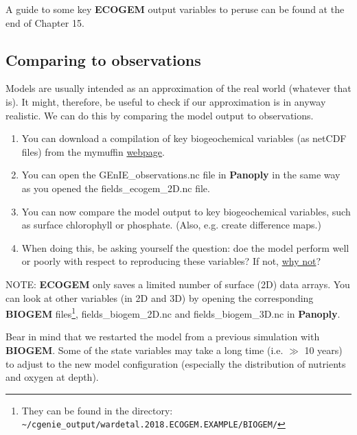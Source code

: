 \documentclass[11pt,fleqn]{book} %
\begin{document}
A guide to some key \textbf{ECOGEM} output variables to peruse can be found at the end of Chapter 15.


\subsection{Comparing to observations}

Models are usually intended as an approximation of the real world (whatever that is). It might, therefore, be useful to check if our approximation is in anyway realistic. We can do this by comparing the model output to observations.

\begin{enumerate}[noitemsep]
\vspace{1mm}
\item You can download a compilation of key biogeochemical variables (as netCDF files) from the \textsf{\small mymuffin} \href{http://www.seao2.info/cgenie/data/GEnIE_observations.nc}{webpage}.
\vspace{1mm}
\item You can open the \textsf{\small GEnIE\_observations.nc} file in \textbf{Panoply} in the same way as you opened the \textsf{\small fields\_ecogem\_2D.nc} file.
\vspace{1mm}
\item You can now compare the model output to key biogeochemical variables, such as surface chlorophyll or phosphate. (Also, e.g. create difference maps.)
\vspace{1mm}
\item When doing this, be asking yourself the question: doe the model perform well or poorly with respect to reproducing these variables? If not, \uline{why not}?
\end{enumerate}
\vspace{2mm}

\noindent NOTE: \textbf{ECOGEM} only saves a limited number of surface (2D) data arrays. You can look at other variables (in 2D and 3D) by opening the corresponding \textbf{BIOGEM} files\footnote{They can be found in the directory:
\\ \texttt{\textasciitilde{}/cgenie\_output/wardetal.2018.ECOGEM.EXAMPLE/BIOGEM/}}, \textsf{\small fields\_biogem\_2D.nc} and \textsf{\small fields\_biogem\_3D.nc} in \textbf{Panoply}.

\noindent Bear in mind that we restarted the model from a previous simulation with \textbf{BIOGEM}. Some of the state variables may take a long time (i.e. $\gg$ 10 years) to adjust to the new model configuration (especially the distribution of nutrients and oxygen at depth).
\end{document}
